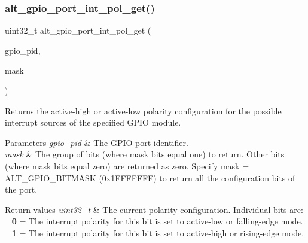 \subsubsection{\texorpdfstring{alt\_gpio\_port\_int\_pol\_get()}{alt\_gpio\_port\_int\_pol\_get()}}
{\footnotesize\ttfamily uint32\+\_\+t alt\+\_\+gpio\+\_\+port\+\_\+int\+\_\+pol\+\_\+get (\begin{DoxyParamCaption}\item[{\mbox{\hyperlink{group__ALT__GPIO__API__CONFIG_gaaf1cf0e2a720d20cd883810f2b59097e}{A\+L\+T\+\_\+\+G\+P\+I\+O\+\_\+\+P\+O\+R\+T\+\_\+t}}}]{gpio\+\_\+pid,  }\item[{uint32\+\_\+t}]{mask }\end{DoxyParamCaption})}

Returns the active-\/high or active-\/low polarity configuration for the possible interrupt sources of the specified G\+P\+IO module.


\begin{DoxyParams}{Parameters}
{\em gpio\+\_\+pid} & The G\+P\+IO port identifier. \\
\hline
{\em mask} & The group of bits (where mask bits equal one) to return. Other bits (where mask bits equal zero) are returned as zero. Specify mask = A\+L\+T\+\_\+\+G\+P\+I\+O\+\_\+\+B\+I\+T\+M\+A\+SK (0x1\+F\+F\+F\+F\+F\+FF) to return all the configuration bits of the port.\\
\hline
\end{DoxyParams}

\begin{DoxyRetVals}{Return values}
{\em uint32\+\_\+t} & The current polarity configuration. Individual bits are\+: ~\newline
 {\bfseries{0}} = The interrupt polarity for this bit is set to active-\/low or falling-\/edge mode. ~\newline
 {\bfseries{1}} = The interrupt polarity for this bit is set to active-\/high or rising-\/edge mode. \\
\hline
\end{DoxyRetVals}
\mbox{\label{group__ALT__GPIO__INT_gaf4f0c4014e0ffd8dae1a565cb3e90ccc}} 
